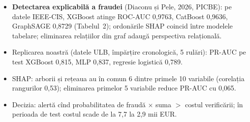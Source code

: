 \begin{itemize}\setlength{\itemsep}{2pt}
  \item \textbf{Detectarea explicabilă a fraudei} (Diaconu și Pele, 2026, PICBE): pe datele IEEE-CIS, XGBoost atinge ROC-AUC 0,9763, CatBoost 0,9636, GraphSAGE 0,8729 (Tabelul~2); ordonările SHAP coincid între modelele tabelare; eliminarea relațiilor din graf adaugă perspectiva relațională.
  \item Replicarea noastră (datele ULB, împărțire cronologică, 5 rulări): PR-AUC pe test XGBoost 0,815, MLP 0,837, regresie logistică 0,789.
  \item SHAP: arborii și rețeaua au în comun 6 dintre primele 10 variabile (corelația rangurilor 0,53); eliminarea primelor 5 variabile reduce PR-AUC cu 0,065.
  \item Decizia: alertă cînd probabilitatea de fraudă $\times$ suma $>$ costul verificării; în perioada de test costul scade de la 7,7 la 2,9 mii EUR.
\end{itemize}
